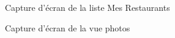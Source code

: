 \begin{figure}[H]
    \label{fig-mes-restaurants}
    \noindent{}
    \caption{Capture d'écran de la liste Mes Restaurants}
\end{figure}

\begin{figure}[H]
    \label{fig-photos}
    \noindent{}
    \caption{Capture d'écran de la vue photos}
\end{figure}

